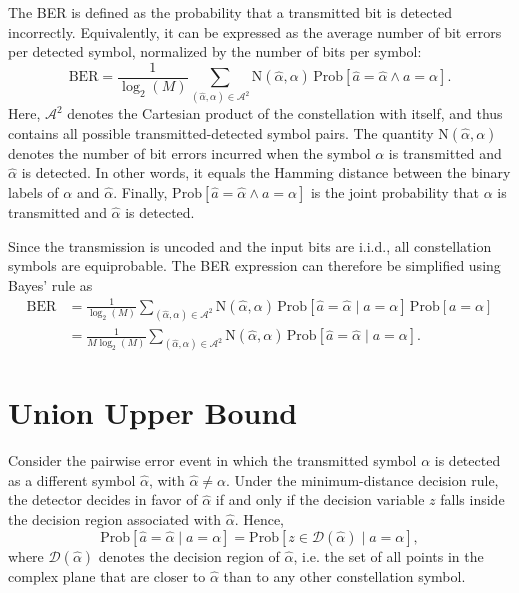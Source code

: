 The \ac{BER} is defined as the probability that a transmitted bit is detected incorrectly.
Equivalently, it can be expressed as the average number of bit errors per detected symbol, normalized by the number of bits per symbol:
\begin{equation}
\label{eq:ber_definition}
    \mathrm{BER} = \frac{1}{\log_2(M)} \sum_{(\hat{\alpha}, \alpha) \in \mathcal{A}^{2}} \mathrm{N}(\hat{\alpha}, \alpha)\, \mathrm{Prob}[\hat{a} = \hat{\alpha} \land a = \alpha].
\end{equation}
Here, $\mathcal{A}^{2}$ denotes the Cartesian product of the constellation with itself, and thus contains all possible transmitted-detected symbol pairs.
The quantity $\mathrm{N}(\hat{\alpha}, \alpha)$ denotes the number of bit errors incurred when the symbol $\alpha$ is transmitted and $\hat{\alpha}$ is detected.
In other words, it equals the Hamming distance between the binary labels of $\alpha$ and $\hat{\alpha}$.
Finally, $\mathrm{Prob}[\hat{a} = \hat{\alpha} \land a = \alpha]$ is the joint probability that $\alpha$ is transmitted and $\hat{\alpha}$ is detected.

Since the transmission is uncoded and the input bits are \ac{i.i.d.}, all constellation symbols are equiprobable.
The \ac{BER} expression can therefore be simplified using Bayes' rule as
\begin{subequations}
\label{eq:ber_simplified}
\begin{align}
    \mathrm{BER}
    &= \frac{1}{\log_2(M)} \sum_{(\hat{\alpha}, \alpha) \in \mathcal{A}^{2}} \mathrm{N}(\hat{\alpha}, \alpha)\, \mathrm{Prob}[\hat{a} = \hat{\alpha} \mid a = \alpha]\, \mathrm{Prob}[a = \alpha] \\
    &= \frac{1}{M \log_2(M)} \sum_{(\hat{\alpha}, \alpha) \in \mathcal{A}^{2}} \mathrm{N}(\hat{\alpha}, \alpha) \, \mathrm{Prob}[\hat{a} = \hat{\alpha} \mid a = \alpha].
\end{align}
\end{subequations}


\section{Union Upper Bound}
\label{appendix_section:union_upper_bound}

Consider the pairwise error event in which the transmitted symbol $\alpha$ is detected as a different symbol $\hat{\alpha}$, with $\hat{\alpha} \neq \alpha$.
Under the minimum-distance decision rule, the detector decides in favor of $\hat{\alpha}$ if and only if the decision variable $z$ falls inside the decision region associated with $\hat{\alpha}$.
Hence,
\begin{equation}
    \mathrm{Prob}[\hat{a} = \hat{\alpha} \mid a = \alpha] = \mathrm{Prob}[z \in \mathcal{D}(\hat{\alpha}) \mid a = \alpha],
\end{equation}
where $\mathcal{D}(\hat{\alpha})$ denotes the decision region of $\hat{\alpha}$, i.e. the set of all points in the complex plane that are closer to $\hat{\alpha}$ than to any other constellation symbol.

